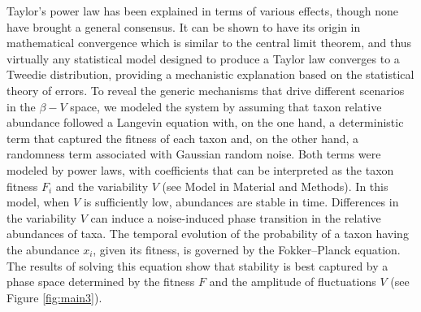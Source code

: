 Taylor's power law has been explained in terms of various effects, though none have brought a general consensus. It can be shown to have its origin in mathematical convergence which is similar to the central limit theorem, and thus virtually any statistical model designed to produce a Taylor law converges to a Tweedie distribution\cite{stat}, providing a mechanistic explanation based on the statistical theory of errors\cite{convergence1,convergence2,convergence3}. To reveal the generic mechanisms that drive different scenarios in the $\beta-V$ space, we modeled the system by assuming that taxon relative abundance followed a Langevin equation with, on the one hand, a deterministic term that captured the fitness of each taxon and, on the other hand, a randomness term associated with Gaussian random noise\cite{ranking}. Both terms were modeled by power laws, with coefficients that can be interpreted as the taxon fitness $F_i$ and the variability $V$ (see Model in Material and Methods). In this model, when $V$ is sufficiently low, abundances are stable in time. Differences in the variability $V$ can induce a noise-induced phase transition in the relative abundances of taxa. The temporal evolution of the probability of a taxon having the abundance $x_i$, given its fitness, is governed by the Fokker--Planck equation. The results of solving this equation show that stability is best captured by a phase space determined by the fitness $F$ and the amplitude of fluctuations $V$ (see Figure \ref{fig:main3}). 

